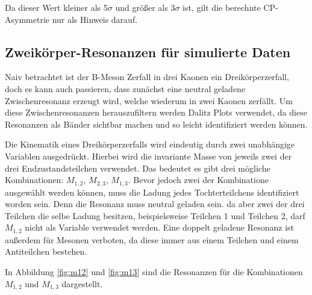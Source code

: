 Da dieser Wert kleiner als 5$\sigma$ und gr\"o\ss er als 3$\sigma$ ist, gilt die berechnte CP-Asymmetrie nur als Hinweis darauf.

\subsection{Zweik\"orper-Resonanzen f\"ur simulierte Daten}
\label{sec:resosim}
Naiv betrachtet ist der B-Meson Zerfall in drei Kaonen ein Dreik\"orperzerfall, doch es kann auch passieren, dass zun\"achst eine neutral geladene Zwischenresonanz erzeugt wird, welche wiederum in zwei Kaonen zerf\"allt.
Um diese Zwischenresonanzen herauszufiltern werden Dalitz Plots verwendet, da diese Resonanzen als B\"ander sichtbar machen und so leicht identifiziert werden k\"onnen.

Die Kinematik eines Dreik\"orperzerfalls wird eindeutig durch zwei unabh\"angige Variablen ausgedr\"uckt. Hierbei wird die invariante Masse von jeweils zwei der drei Endzustandsteilchen verwendet.
Das bedeutet es gibt drei m\"ogliche Kombinationen:
$M_{1,2}$, $M_{2,3}$, $M_{1,3}$.
Bevor jedoch zwei der Kombinatione ausgew\"ahlt werden k\"onnen, muss die Ladung jedes Tochterteilchens identifiziert worden sein.
Denn die Resonanz muss neutral geladen sein. da aber zwei der drei Teilchen die selbe Ladung besitzen, beispielsweise Teilchen 1 und Teilchen 2, darf $M_{1,2}$ nicht als Variable verwendet werden.
Eine doppelt geladene Resonanz ist au\ss erdem f\"ur Mesonen verboten, da diese immer aus einem Teilchen und einem Antiteilchen bestehen.

In Abbildung \ref{fig:m12} und \ref{fig:m13} sind die Resonanzen f\"ur die Kombinationen $M_{1,2}$ und $M_{1,3}$ dargestellt.

